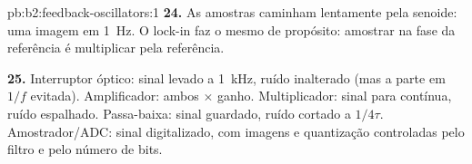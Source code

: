 \begin{solution}{pb:b2:feedback-oscillators:1}
\textbf{24.} As amostras caminham lentamente pela senoide: uma imagem em \qty{1}{Hz}.
O lock-in faz o mesmo de propósito: amostrar na fase da referência
é multiplicar pela referência.

\textbf{25.} Interruptor óptico: sinal levado a \qty{1}{kHz}, ruído inalterado (mas
a parte em $1/f$ evitada). Amplificador: ambos $\times$ ganho. Multiplicador: sinal
para contínua, ruído espalhado. Passa-baixa: sinal guardado, ruído cortado a $1/4\tau$.
Amostrador/ADC: sinal digitalizado, com imagens e quantização controladas pelo
filtro e pelo número de bits.
\end{solution}
